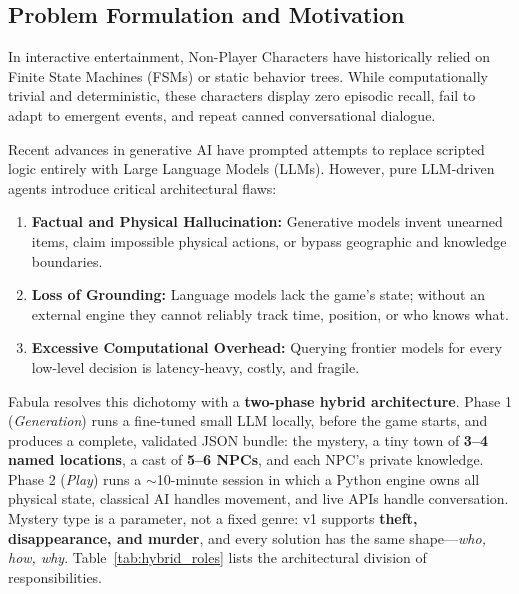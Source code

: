 \documentclass[11pt,a4paper]{article}
\begin{document}
\subsection{Problem Formulation and Motivation}
In interactive entertainment, Non-Player Characters have historically relied on Finite State Machines (FSMs) or static behavior trees. While computationally trivial and deterministic, these characters display zero episodic recall, fail to adapt to emergent events, and repeat canned conversational dialogue.

Recent advances in generative AI have prompted attempts to replace scripted logic entirely with Large Language Models (LLMs). However, pure LLM-driven agents introduce critical architectural flaws:
\begin{enumerate}
    \item \textbf{Factual and Physical Hallucination:} Generative models invent unearned items, claim impossible physical actions, or bypass geographic and knowledge boundaries.
    \item \textbf{Loss of Grounding:} Language models lack the game's state; without an external engine they cannot reliably track time, position, or who knows what.
    \item \textbf{Excessive Computational Overhead:} Querying frontier models for every low-level decision is latency-heavy, costly, and fragile.
\end{enumerate}

Fabula resolves this dichotomy with a \textbf{two-phase hybrid architecture}. Phase 1 (\emph{Generation}) runs a fine-tuned small LLM locally, before the game starts, and produces a complete, validated JSON bundle: the mystery, a tiny town of \textbf{3--4 named locations}, a cast of \textbf{5--6 NPCs}, and each NPC's private knowledge. Phase 2 (\emph{Play}) runs a $\sim$10-minute session in which a Python engine owns all physical state, classical AI handles movement, and live APIs handle conversation. Mystery type is a parameter, not a fixed genre: v1 supports \textbf{theft, disappearance, and murder}, and every solution has the same shape---\emph{who, how, why}. Table~\ref{tab:hybrid_roles} lists the architectural division of responsibilities.
\end{document}

